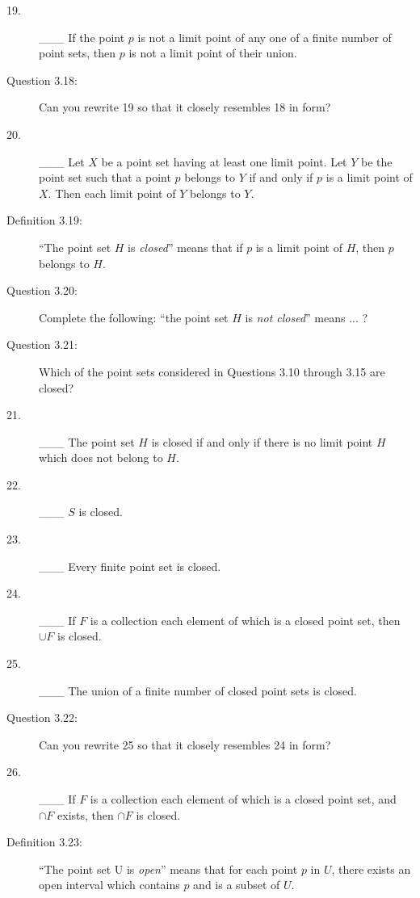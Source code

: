 \documentclass{book}
\begin{document}
\begin{description}
\item[19.] \_\_\_ If the point $p$ is not a limit point of any one of a finite number of point sets, then $p$ is not a limit point of their union.

\item[Question 3.18:] Can you rewrite 19 so that it closely resembles 18 in form?

\item[20.] \_\_\_ Let $X$ be a point set having at least one limit point. Let $Y$ be the point set such that a point $p$ belongs to $Y$ if and only if $p$ is a limit point of $X$. Then each limit point of $Y$ belongs to $Y$.

\item[Definition 3.19:] ``The point set $H$ is \emph{closed}'' means that if $p$ is a limit point of $H$, then $p$ belongs to $H$.

\item[Question 3.20:] Complete the following: ``the point set $H$ is \emph{not closed}'' means ... ?

\item[Question 3.21:] Which of the point sets considered in Questions 3.10 through 3.15 are closed?

\item[21.] \_\_\_ The point set $H$ is closed if and only if there is no limit point $H$ which does not belong to $H$.

\item[22.] \_\_\_ $S$ is closed.

\item[23.] \_\_\_ Every finite point set is closed.

\item[24.] \_\_\_ If $F$ is a collection each element of which is a closed point set, then $\cup F$ is closed.

\item[25.] \_\_\_ The union of a finite number of closed point sets is closed.

\item[Question 3.22:] Can you rewrite 25 so that it closely resembles 24 in form?

\item[26.] \_\_\_ If $F$ is a collection each element of which is a closed point set, and $\cap F$ exists, then $\cap F$ is closed.

\item[Definition 3.23:] ``The point set U is \emph{open}'' means that for each point $p$ in $U$, there exists an open interval which contains $p$ and is a subset of $U$.


\end{description}
\end{document}
